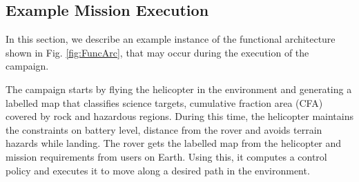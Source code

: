 \documentclass[letterpaper]{article} %
\begin{document}
	\subsection{Example Mission Execution}
	\label{subsec:ExampleMissionExecution}
	In this section, we describe an example instance of the functional architecture shown in Fig. \ref{fig:FuncArc}, that may occur during the execution of the campaign. 
	
	The campaign starts by flying the helicopter in the environment and generating a labelled map that classifies science targets, cumulative fraction area (CFA) covered by rock and hazardous regions. During this time, the helicopter maintains the constraints on battery level, distance from the rover and avoids terrain hazards while landing. The rover gets the labelled map from the helicopter and mission requirements from users on Earth. Using this, it computes a control policy and executes it to move along a desired path in the environment.
	
\end{document}
